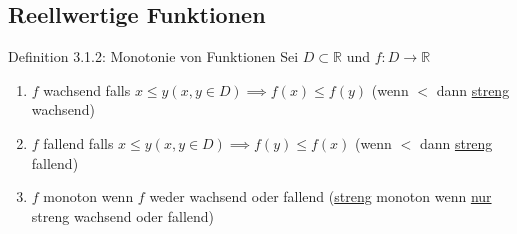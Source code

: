\documentclass[a4paper,10pt]{article}
\begin{document}
\subsection{Reellwertige Funktionen}
\begin{defbox}
    {Definition 3.1.2: Monotonie von Funktionen}
    Sei $D\subset\mathbb R$ und $f:D\longrightarrow \mathbb R$
    \begin{enumerate}
        \item $f$ wachsend falls $x\le y (x,y \in D)\implies f(x)\le f(y)$ (wenn $<$ dann \underline{streng} wachsend)
        \item $f$ fallend falls $x\le y (x,y \in D)\implies f(y)\le  f(x)$ (wenn $<$ dann \underline{streng} fallend)
        \item $f$ monoton wenn $f$ weder wachsend oder fallend (\underline{streng} monoton wenn \underline{nur} streng wachsend oder fallend)
    \end{enumerate}
\end{defbox}
\end{document}
